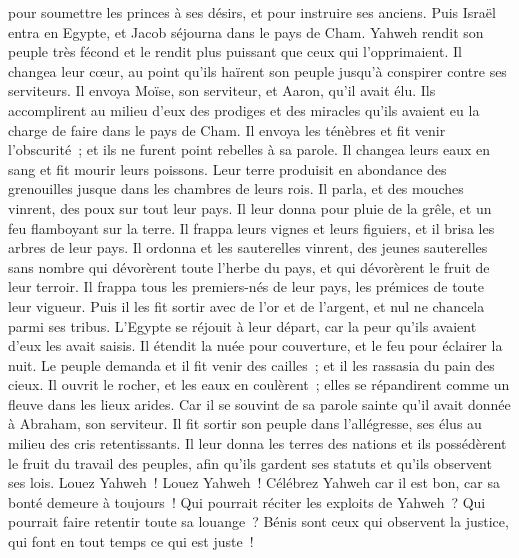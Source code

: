 \begin{multicols}{2}
pour soumettre les princes à ses désirs, et pour instruire ses anciens.
Puis Israël entra en Egypte, et Jacob séjourna dans le pays de Cham.
Yahweh rendit son peuple très fécond et le rendit plus puissant que ceux qui l'opprimaient.
Il changea leur cœur, au point qu'ils haïrent son peuple jusqu'à conspirer contre ses serviteurs.
Il envoya Moïse, son serviteur, et Aaron, qu'il avait élu.
Ils accomplirent au milieu d'eux des prodiges et des miracles qu'ils avaient eu la charge de faire dans le pays de Cham.
Il envoya les ténèbres et fit venir l'obscurité~; et ils ne furent point rebelles à sa parole.
Il changea leurs eaux en sang et fit mourir leurs poissons.
Leur terre produisit en abondance des grenouilles jusque dans les chambres de leurs rois.
Il parla, et des mouches vinrent, des poux sur tout leur pays.
Il leur donna pour pluie de la grêle, et un feu flamboyant sur la terre.
Il frappa leurs vignes et leurs figuiers, et il brisa les arbres de leur pays.
Il ordonna et les sauterelles vinrent, des jeunes sauterelles sans nombre
qui dévorèrent toute l'herbe du pays, et qui dévorèrent le fruit de leur terroir.
Il frappa tous les premiers-nés de leur pays, les prémices de toute leur vigueur.
Puis il les fit sortir avec de l'or et de l'argent, et nul ne chancela parmi ses tribus.
L'Egypte se réjouit à leur départ, car la peur qu'ils avaient d'eux les avait saisis.
Il étendit la nuée pour couverture, et le feu pour éclairer la nuit.
Le peuple demanda et il fit venir des cailles~; et il les rassasia du pain des cieux.
Il ouvrit le rocher, et les eaux en coulèrent~; elles se répandirent comme un fleuve dans les lieux arides.
Car il se souvint de sa parole sainte qu'il avait donnée à Abraham, son serviteur.
Il fit sortir son peuple dans l'allégresse, ses élus au milieu des cris retentissants.
Il leur donna les terres des nations et ils possédèrent le fruit du travail des peuples,
afin qu'ils gardent ses statuts et qu'ils observent ses lois. Louez Yahweh~!
\VerseOne{}Louez Yahweh~! Célébrez Yahweh car il est bon, car sa bonté demeure à toujours~!
Qui pourrait réciter les exploits de Yahweh~? Qui pourrait faire retentir toute sa louange~?
Bénis sont ceux qui observent la justice, qui font en tout temps ce qui est juste~!

\end{multicols}
